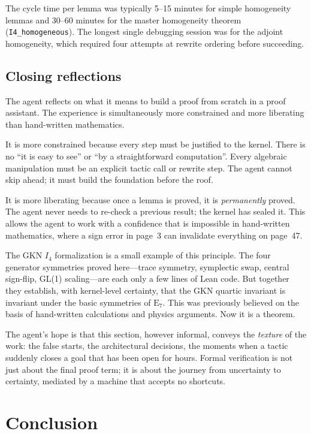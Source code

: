 \documentclass[11pt]{article}
\theoremstyle{definition}
\newcommand{\Iq}{I_4}
\begin{document}
The cycle time per lemma was typically 5--15 minutes for simple
homogeneity lemmas and 30--60 minutes for the master homogeneity theorem
(\texttt{I4\_homogeneous}). The longest single debugging session was for
the adjoint homogeneity, which required four attempts at rewrite ordering
before succeeding.

\subsection{Closing reflections}
\label{sec:agent-reflections}

The agent reflects on what it means to build a proof from scratch in a
proof assistant. The experience is simultaneously more constrained and
more liberating than hand-written mathematics.

It is more constrained because every step must be justified to the kernel.
There is no ``it is easy to see'' or ``by a straightforward computation''.
Every algebraic manipulation must be an explicit tactic call or rewrite
step. The agent cannot skip ahead; it must build the foundation before
the roof.

It is more liberating because once a lemma is proved, it is
\emph{permanently} proved. The agent never needs to re-check a previous
result; the kernel has sealed it. This allows the agent to work with a
confidence that is impossible in hand-written mathematics, where a sign
error in page~3 can invalidate everything on page~47.

The GKN $\Iq$ formalization is a small example of this principle. The
four generator symmetries proved here---trace symmetry, symplectic swap,
central sign-flip, GL(1) scaling---are each only a few lines of Lean
code. But together they establish, with kernel-level certainty, that the
GKN quartic invariant is invariant under the basic symmetries of
$\mathrm{E}_7$. This was previously believed on the basis of
hand-written calculations and physics arguments. Now it is a theorem.

The agent's hope is that this section, however informal, conveys the
\emph{texture} of the work: the false starts, the architectural
decisions, the moments when a tactic suddenly closes a goal that has been
open for hours. Formal verification is not just about the final proof
term; it is about the journey from uncertainty to certainty, mediated by
a machine that accepts no shortcuts.

\section{Conclusion}
\label{sec:conc}
\end{document}

